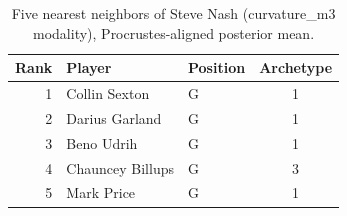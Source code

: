 \begin{table}[htbp]
  \centering\small
  \begin{tabular}{rllc}
    \toprule
    Rank & Player & Position & Archetype \\
    \midrule
    1 & Collin Sexton & G & 1 \\
    2 & Darius Garland & G & 1 \\
    3 & Beno Udrih & G & 1 \\
    4 & Chauncey Billups & G & 3 \\
    5 & Mark Price & G & 1 \\
    \bottomrule
  \end{tabular}
  \caption{Five nearest neighbors of Steve Nash (curvature_m3 modality), Procrustes-aligned posterior mean.}
  \label{tab:Steve_Nash_neighbors_curvature_m3}
\end{table}

